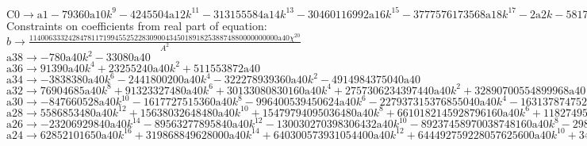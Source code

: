 \documentclass[12pt,a4paper,draft]{article}
\begin{document}
$\text{C0}\to \text{a1}-79360 \text{a10} k^9-4245504 \text{a12} k^{11}-313155584 \text{a14} k^{13}-30460116992 \text{a16} k^{15}-3777576173568 \text{a18} k^{17}-2 \text{a2} k-581777702256640 \text{a20} k^{19}-108932957168730112 \text{a22} k^{21}-24370173276164456448 \text{a24} k^{23}-6419958484945407574016 \text{a26} k^{25}-1967044844910430876860416 \text{a28} k^{27}-693575525634287935244206080 \text{a30} k^{29}-278846808228005417477465964544 \text{a32} k^{31}-126799861926498005417315327279104 \text{a34} k^{33}-64751460964231996082583012567416832 \text{a36} k^{35}-36897346809832246270417188902181797888 \text{a38} k^{37}-8 \text{a4} k^3-23328132996692401757727665665019771617280 \text{a40} k^{39}-96 \text{a6} k^5-2176 \text{a8} k^7$\\
Constraints on coefficients from real part of equation:
\\$b\to \frac{1140063332428478117199455252283090043450189182538874880000000000 \text{a40} \chi ^{20}}{A^2}$\\
$\text{a38}\to -780 \text{a40} k^2-33080 \text{a40}$\\
$\text{a36}\to 91390 \text{a40} k^4+23255240 \text{a40} k^2+511553872 \text{a40}$\\
$\text{a34}\to -3838380 \text{a40} k^6-2441800200 \text{a40} k^4-322278939360 \text{a40} k^2-4914984375040 \text{a40}$\\
$\text{a32}\to 76904685 \text{a40} k^8+91323327480 \text{a40} k^6+30133080830160 \text{a40} k^4+2757306234397440 \text{a40} k^2+32890700554899968 \text{a40}$\\
$\text{a30}\to -847660528 \text{a40} k^{10}-1617727515360 \text{a40} k^8-996400539450624 \text{a40} k^6-227937315376855040 \text{a40} k^4-16313787475230384128 \text{a40} k^2-162880018162989076480 \text{a40}$\\
$\text{a28}\to 5586853480 \text{a40} k^{12}+15638032648480 \text{a40} k^{10}+15479794095036480 \text{a40} k^8+6610182145928796160 \text{a40} k^6+1182749591954202849280 \text{a40} k^4+70852807900900248268800 \text{a40} k^2+619056335924838086221824 \text{a40}$\\
$\text{a26}\to -23206929840 \text{a40} k^{14}-89563277895840 \text{a40} k^{12}-130030270398306432 \text{a40} k^{10}-89237458970038748160 \text{a40} k^8-29805289717245911801856 \text{a40} k^6-4463726897756715640934400 \text{a40} k^4-234003294979588796591849472 \text{a40} k^2-1848204996381143924264140800 \text{a40}$\\
$\text{a24}\to 62852101650 \text{a40} k^{16}+319868849628000 \text{a40} k^{14}+640300573931054400 \text{a40} k^{12}+644492759228057625600 \text{a40} k^{10}+345954255646604333414400 \text{a40} k^8+96714082784728838886912000 \text{a40} k^6+12675178478061059815391846400 \text{a40} k^4+600666623823871775385845760000 \text{a40} k^2+4399934294893623193319928299520 \text{a40}$\\
\end{document}
